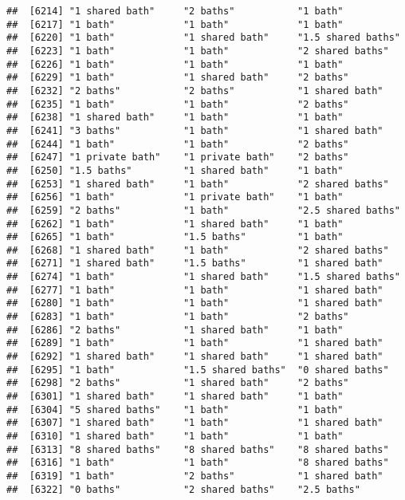 \documentclass[
]{article}
\begin{document}
\begin{verbatim}
##  [6214] "1 shared bath"     "2 baths"           "1 bath"           
##  [6217] "1 bath"            "1 bath"            "1 bath"           
##  [6220] "1 bath"            "1 shared bath"     "1.5 shared baths" 
##  [6223] "1 bath"            "1 bath"            "2 shared baths"   
##  [6226] "1 bath"            "1 bath"            "1 bath"           
##  [6229] "1 bath"            "1 shared bath"     "2 baths"          
##  [6232] "2 baths"           "2 baths"           "1 shared bath"    
##  [6235] "1 bath"            "1 bath"            "2 baths"          
##  [6238] "1 shared bath"     "1 bath"            "1 bath"           
##  [6241] "3 baths"           "1 bath"            "1 shared bath"    
##  [6244] "1 bath"            "1 bath"            "2 baths"          
##  [6247] "1 private bath"    "1 private bath"    "2 baths"          
##  [6250] "1.5 baths"         "1 shared bath"     "1 bath"           
##  [6253] "1 shared bath"     "1 bath"            "2 shared baths"   
##  [6256] "1 bath"            "1 private bath"    "1 bath"           
##  [6259] "2 baths"           "1 bath"            "2.5 shared baths" 
##  [6262] "1 bath"            "1 shared bath"     "1 bath"           
##  [6265] "1 bath"            "1.5 baths"         "1 bath"           
##  [6268] "1 shared bath"     "1 bath"            "2 shared baths"   
##  [6271] "1 shared bath"     "1.5 baths"         "1 shared bath"    
##  [6274] "1 bath"            "1 shared bath"     "1.5 shared baths" 
##  [6277] "1 bath"            "1 bath"            "1 shared bath"    
##  [6280] "1 bath"            "1 bath"            "1 shared bath"    
##  [6283] "1 bath"            "1 bath"            "2 baths"          
##  [6286] "2 baths"           "1 shared bath"     "1 bath"           
##  [6289] "1 bath"            "1 bath"            "1 shared bath"    
##  [6292] "1 shared bath"     "1 shared bath"     "1 shared bath"    
##  [6295] "1 bath"            "1.5 shared baths"  "0 shared baths"   
##  [6298] "2 baths"           "1 shared bath"     "2 baths"          
##  [6301] "1 shared bath"     "1 shared bath"     "1 bath"           
##  [6304] "5 shared baths"    "1 bath"            "1 bath"           
##  [6307] "1 shared bath"     "1 bath"            "1 shared bath"    
##  [6310] "1 shared bath"     "1 bath"            "1 bath"           
##  [6313] "8 shared baths"    "8 shared baths"    "8 shared baths"   
##  [6316] "1 bath"            "1 bath"            "8 shared baths"   
##  [6319] "1 bath"            "2 baths"           "1 shared bath"    
##  [6322] "0 baths"           "2 shared baths"    "2.5 baths"        

\end{verbatim}
\end{document}
